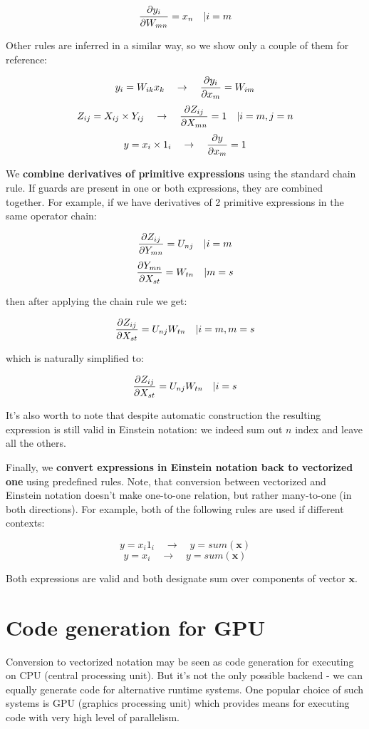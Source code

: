 \documentclass[conference]{IEEEtran}
\begin{document}
$$\pdv{y_i}{W_{mn}} = x_n \quad | i = m$$

Other rules are inferred in a similar way, so we show only a couple of
them for reference:

$$y_i = W_{ik}x_k \quad \rightarrow \quad \pdv{y_i}{x_m} = W_{im}$$
$$Z_{ij} = X_{ij} \times Y_{ij} \quad \rightarrow \quad \pdv{Z_{ij}}{X_{mn}} = 1 \quad | i = m, j = n$$
$$y = x_i \times 1_i \quad \rightarrow \quad \pdv{y}{x_m} = 1$$


We \textbf{combine derivatives of primitive expressions} using the
standard chain rule. If guards are present in one or both expressions,
they are combined together. For example, if we have derivatives of 2
primitive expressions in the same operator chain:

$$\pdv{Z_{ij}}{Y_{mn}} = U_{nj} \quad | i = m$$
$$\pdv{Y_{mn}}{X_{st}} = W_{tn} \quad | m = s$$

then after applying the chain rule we get:

$$\pdv{Z_{ij}}{X_{st}} = U_{nj}W_{tn} \quad | i = m, m = s$$

which is naturally simplified to:

$$\pdv{Z_{ij}}{X_{st}} = U_{nj}W_{tn} \quad | i = s$$

It's also worth to note that despite automatic construction the
resulting expression is still valid in Einstein notation: we indeed
sum out $n$ index and leave all the others.

Finally, we \textbf{convert expressions in Einstein notation back to
  vectorized one} using predefined rules. Note, that conversion
between vectorized and Einstein notation doesn't make one-to-one
relation, but rather many-to-one (in both directions). For example,
both of the following rules are used if different contexts:

$$y = x_i1_i \quad \rightarrow \quad y = sum(\pmb{x})$$
$$y = x_i \quad \rightarrow \quad y = sum(\pmb{x})$$

Both expressions are valid and both designate sum over components of
vector $\pmb{x}$.

\section{Code generation for GPU}

Conversion to vectorized notation may be seen as code generation for
executing on CPU (central processing unit). But it's not the only
possible backend - we can equally generate code for alternative
runtime systems. One popular choice of such systems is GPU (graphics
processing unit) which provides means for executing code with very
high level of parallelism.
\end{document}

